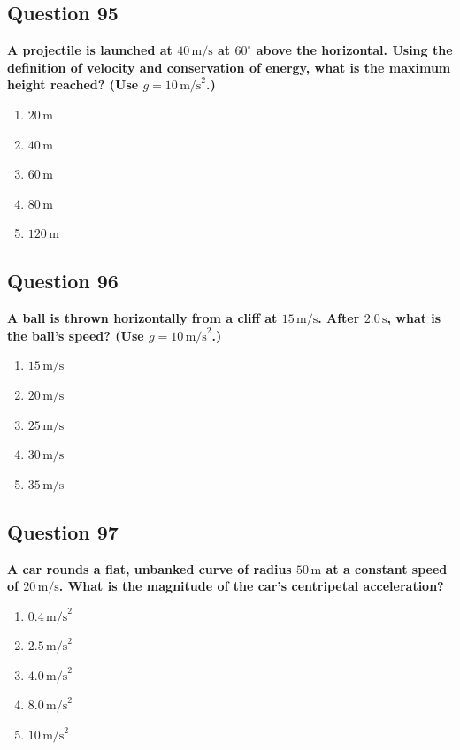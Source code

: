 \documentclass[12pt,letterpaper]{article}
\begin{document}
\subsection{Question 95}

\begin{questionbox}
\textbf{A projectile is launched at $40\,\text{m/s}$ at $60^\circ$ above the horizontal. Using the definition of velocity and conservation of energy, what is the maximum height reached? (Use $g = 10\,\text{m/s}^2$.)}

\begin{enumerate}[label=\alph*)]
    \item $20\,\text{m}$
    \item $40\,\text{m}$
    \item $60\,\text{m}$
    \item $80\,\text{m}$
    \item $120\,\text{m}$
\end{enumerate}
\end{questionbox}

\subsection{Question 96}

\begin{questionbox}
\textbf{A ball is thrown horizontally from a cliff at $15\,\text{m/s}$. After $2.0\,\text{s}$, what is the ball's speed? (Use $g = 10\,\text{m/s}^2$.)}

\begin{enumerate}[label=\alph*)]
    \item $15\,\text{m/s}$
    \item $20\,\text{m/s}$
    \item $25\,\text{m/s}$
    \item $30\,\text{m/s}$
    \item $35\,\text{m/s}$
\end{enumerate}
\end{questionbox}

\subsection{Question 97}

\begin{questionbox}
\textbf{A car rounds a flat, unbanked curve of radius $50\,\text{m}$ at a constant speed of $20\,\text{m/s}$. What is the magnitude of the car's centripetal acceleration?}

\begin{enumerate}[label=\alph*)]
    \item $0.4\,\text{m/s}^2$
    \item $2.5\,\text{m/s}^2$
    \item $4.0\,\text{m/s}^2$
    \item $8.0\,\text{m/s}^2$
    \item $10\,\text{m/s}^2$
\end{enumerate}
\end{questionbox}
\end{document}

